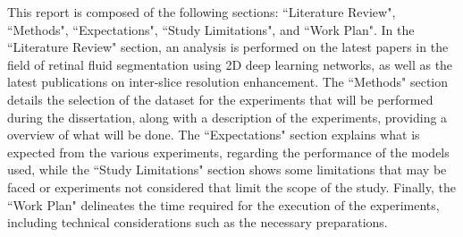 This report is composed of the following sections: ``Literature Review", ``Methods", ``Expectations", ``Study Limitations", and ``Work Plan". In the ``Literature Review" section, an analysis is performed on the latest papers in the field of retinal fluid segmentation using 2D deep learning networks, as well as the latest publications on inter-slice resolution enhancement. The ``Methods" section details the selection of the dataset for the experiments that will be performed during the dissertation, along with a description of the experiments, providing a overview of what will be done. The ``Expectations" section explains what is expected from the various experiments, regarding the performance of the models used, while the ``Study Limitations" section shows some limitations that may be faced or experiments not considered that limit the scope of the study. Finally, the ``Work Plan" delineates the time required for the execution of the experiments, including technical considerations such as the necessary preparations.
